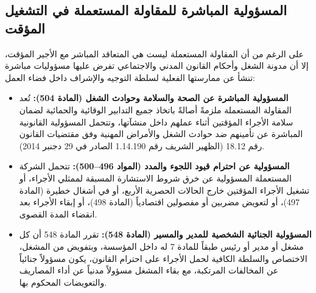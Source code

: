 \subsection{المسؤولية المباشرة للمقاولة المستعملة في التشغيل المؤقت}
على الرغم من أن المقاولة المستعملة ليست هي المتعاقد المباشر مع الأجير المؤقت، إلا أن مدونة الشغل وأحكام القانون المدني والاجتماعي تفرض عليها مسؤوليات مباشرة تنشأ عن ممارستها الفعلية لسلطة التوجيه والإشراف داخل فضاء العمل:
\begin{itemize}[leftmargin=*, itemsep=5pt]
    \item \textbf{المسؤولية المباشرة عن الصحة والسلامة وحوادث الشغل (المادة \textenglish{504}):} تُعد المقاولة المستعملة ملزمةً أصالةً باتخاذ جميع التدابير الوقائية والحمائية لضمان سلامة الأجراء المؤقتين أثناء عملهم داخل منشآتها، وتتحمل المسؤولية القانونية المباشرة عن تأمينهم ضد حوادث الشغل والأمراض المهنية وفق مقتضيات القانون رقم \textenglish{18.12} (الظهير الشريف رقم \textenglish{1.14.190} الصادر في \textenglish{29} دجنبر \textenglish{2014}).
    \item \textbf{المسؤولية عن احترام قيود اللجوء والمدد (المواد \textenglish{496}--\textenglish{500}):} تتحمل الشركة المستعملة المسؤولية عن خرق شروط الاستشارة المسبقة لممثلي الأجراء، أو تشغيل الأجراء المؤقتين خارج الحالات الحصرية الأربع، أو في أشغال خطيرة (المادة \textenglish{497})، أو لتعويض مضربين أو مفصولين اقتصادياً (المادة \textenglish{498})، أو إبقاء الأجراء بعد انقضاء المدة القصوى.
    \item \textbf{المسؤولية الجنائية الشخصية للمدير والمسير (المادة \textenglish{548}):} تقرر المادة \textenglish{548} أن كل مشغل أو مدير أو رئيس طبقاً للمادة \textenglish{7} له داخل المؤسسة، وبتفويض من المشغل، الاختصاص والسلطة الكافية لحمل الأجراء على احترام القانون، يكون مسؤولاً جنائياً عن المخالفات المرتكبة، مع بقاء المشغل مسؤولاً مدنياً عن أداء المصاريف والتعويضات المحكوم بها.
\end{itemize}

